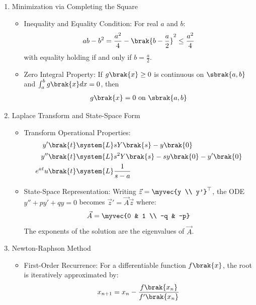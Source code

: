\begin{enumerate}[label=\thesubsection.\arabic*, ref=\thesubsection.\theenumi,itemsep=0pt]
\item Minimization via Completing the Square
\begin{itemize}
\item Inequality and Equality Condition:
For real $a$ and $b$:
\begin{align}
a b - b^2 = \frac{a^2}{4} - \brak{b - \frac{a}{2}}^2 \le \frac{a^2}{4}
\label{eq:cts} %
\end{align}
with equality holding if and only if $b = \frac{a}{2}$.
\item Zero Integral Property:
If $g\brak{x} \ge 0$ is continuous on $\sbrak{a,b}$ and $\int_{a}^{b} g\brak{x} dx = 0$, then
\begin{align}
g\brak{x} = 0 \text{ on } \sbrak{a,b}
\label{eq:zeroint}
\end{align}
\end{itemize}

\item Laplace Transform and State-Space Form
\begin{itemize}
\item Transform Operational Properties:
\begin{align}
y'\brak{t} &\system{L} s Y\brak{s} - y\brak{0} \label{eq:lap1} \\ %
y''\brak{t} &\system{L} s^2 Y\brak{s} - s y\brak{0} - y'\brak{0} \label{eq:lap2} \\ %
e^{at} u\brak{t} &\system{L} \frac{1}{s - a} \label{eq:lapexp} %
\end{align}
\item State-Space Representation:
Writing $\vec{z} = \myvec{y \\ y'}^\top$, the ODE $y'' + p y' + q y = 0$ becomes $\vec{z}' = \vec{A}\vec{z}$ where:
\begin{align}
\vec{A} = \myvec{0 & 1 \\ -q & -p}
\label{eq:ss} %
\end{align}
The exponents of the solution are the eigenvalues of $\vec{A}$.
\end{itemize}

\item Newton-Raphson Method
\begin{itemize}
\item First-Order Recurrence:
For a differentiable function $f\brak{x}$, the root is iteratively approximated by:
\begin{align}
x_{n+1} = x_n - \frac{f\brak{x_n}}{f'\brak{x_n}}
\label{eq:nr} %
\end{align}
\end{itemize}


\end{enumerate}
